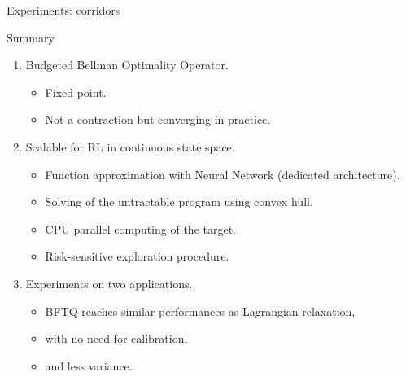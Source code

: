 \documentclass{beamer}
\begin{document}
    \begin{frame}{Experiments: corridors}
        \href{scaling-up-brl.github.io-master/corridors.html}{}

    \end{frame}


    \begin{frame}{Summary}

        \begin{enumerate}[+]
            \pause\item<1-> Budgeted Bellman Optimality Operator.
            \begin{itemize}
                \pause\item Fixed point.
                \pause\item Not a contraction but converging in practice.
            \end{itemize}
            \pause\item<2-> Scalable for RL in continuous state space.
            \begin{itemize}
                \pause\item Function approximation with Neural Network (dedicated architecture).
                \pause\item Solving of the untractable program using convex hull.
                \pause\item CPU parallel computing of the target.
                \pause\item Risk-sensitive exploration procedure.
            \end{itemize}

            \pause\item<3-> Experiments on two applications.
            \begin{itemize}
                \pause\item BFTQ reaches similar performances as Lagrangian relaxation,
                \pause\item with no need for calibration,
                \pause\item and less variance.
            \end{itemize}
        \end{enumerate}

    \end{frame}
\end{document}
